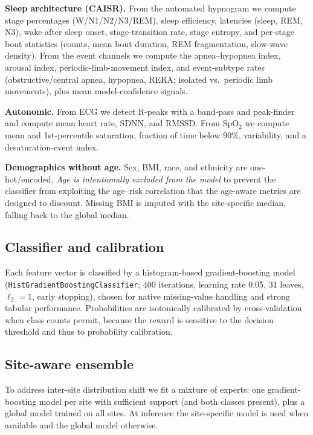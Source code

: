 \documentclass{cinc}
\begin{document}
\textbf{Sleep architecture (CAISR).} From the automated hypnogram we compute
stage percentages (W/N1/N2/N3/REM), sleep efficiency, latencies (sleep, REM,
N3), wake after sleep onset, stage-transition rate, stage entropy, and
per-stage bout statistics (counts, mean bout duration, REM fragmentation,
slow-wave density). From the event channels we compute the
apnea--hypopnea index, arousal index, periodic-limb-movement index, and
event-subtype rates (obstructive/central apnea, hypopnea, RERA; isolated vs.\
periodic limb movements), plus mean model-confidence signals.

\textbf{Autonomic.} From ECG we detect R-peaks with a band-pass and
peak-finder and compute mean heart rate, SDNN, and RMSSD. From SpO$_2$ we
compute mean and 1st-percentile saturation, fraction of time below 90\%,
variability, and a desaturation-event index.

\textbf{Demographics without age.} Sex, BMI, race, and ethnicity are
one-hot/encoded. \emph{Age is intentionally excluded from the model} to
prevent the classifier from exploiting the age--risk correlation that the
age-aware metrics are designed to discount. Missing BMI is imputed with the
site-specific median, falling back to the global median.

\subsection{Classifier and calibration}
Each feature vector is classified by a histogram-based gradient-boosting model
(\texttt{HistGradientBoostingClassifier}; 400 iterations, learning rate 0.05,
31 leaves, $\ell_2=1$, early stopping), chosen for native missing-value
handling and strong tabular performance. Probabilities are isotonically
calibrated by cross-validation when class counts permit, because the reward is
sensitive to the decision threshold and thus to probability calibration.

\subsection{Site-aware ensemble}
To address inter-site distribution shift we fit a mixture of experts: one
gradient-boosting model per site with sufficient support (and both classes
present), plus a global model trained on all sites. At inference the
site-specific model is used when available and the global model otherwise.
\end{document}
